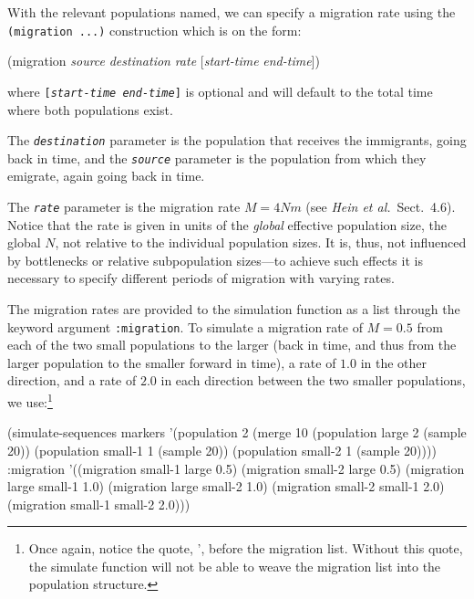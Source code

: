 \documentclass{manual}
\begin{document}
\begin{empfile}
With the relevant populations named, we can specify a migration rate
using the \texttt{(migration ...)} construction which is on the form:
\begin{code}
(migration \textit{source} \textit{destination} \textit{rate} [\textit{start-time} \textit{end-time}])
\end{code}
where \texttt{[\textit{start-time} \textit{end-time}]} is optional and
will default to the total time where both populations exist.

The \texttt{\textit{destination}} parameter is the population that
receives the immigrants, going back in time, and the
\texttt{\textit{source}} parameter is the population from which they
emigrate, again going back in time.

The \texttt{\textit{rate}} parameter is the migration rate $M=4Nm$
(see \emph{Hein et al.}\ Sect.~4.6).  Notice that the rate is given in
units of the \emph{global} effective population size, the global $N$,
not relative to the individual population sizes.  It is, thus, not
influenced by bottlenecks or relative subpopulation sizes---to achieve
such effects it is necessary to specify different periods of migration
with varying rates.

The migration rates are provided to the simulation function as a list
through the keyword argument \texttt{:migration}.  To simulate a
migration rate of $M=0.5$ from each of the two small populations to
the larger (back in time, and thus from the larger population to the
smaller forward in time), a rate of $1.0$ in the other direction, and
a rate of $2.0$ in each direction between the two smaller populations,
we use:\footnote{
  Once again, notice the quote, ', before the migration list.  Without
  this quote, the simulate function will not be able to weave the
  migration list into the population structure.
}
\begin{code}
(simulate-sequences markers
   '(population 2 (merge 10 (population large   2 (sample 20))
                            (population small-1 1 (sample 20))
                            (population small-2 1 (sample 20))))
   :migration '((migration small-1 large   0.5)
                (migration small-2 large   0.5)
                (migration large small-1   1.0)
                (migration large small-2   1.0)
                (migration small-2 small-1 2.0)
                (migration small-1 small-2 2.0)))
\end{code}


\end{empfile}
\end{document}
